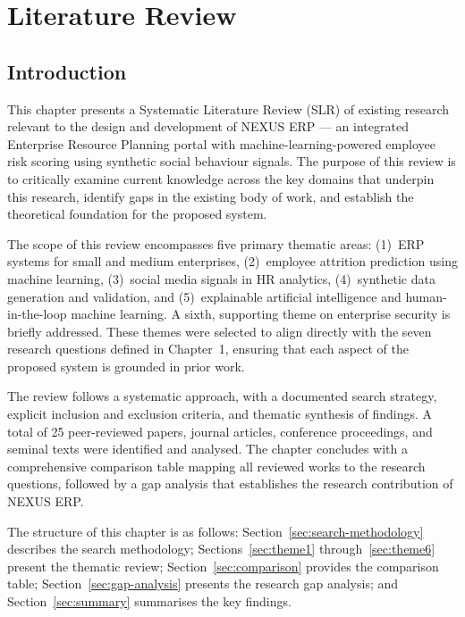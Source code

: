 \documentclass[12pt,a4paper]{article}
\begin{document}
\setcounter{section}{1}  %

\section{Literature Review}
\label{ch:literature-review}

\subsection{Introduction}
\label{sec:introduction}

This chapter presents a Systematic Literature Review (SLR) of existing research relevant to the design and development of NEXUS ERP --- an integrated Enterprise Resource Planning portal with machine-learning-powered employee risk scoring using synthetic social behaviour signals. The purpose of this review is to critically examine current knowledge across the key domains that underpin this research, identify gaps in the existing body of work, and establish the theoretical foundation for the proposed system.

The scope of this review encompasses five primary thematic areas: (1)~ERP systems for small and medium enterprises, (2)~employee attrition prediction using machine learning, (3)~social media signals in HR analytics, (4)~synthetic data generation and validation, and (5)~explainable artificial intelligence and human-in-the-loop machine learning. A sixth, supporting theme on enterprise security is briefly addressed. These themes were selected to align directly with the seven research questions defined in Chapter~1, ensuring that each aspect of the proposed system is grounded in prior work.

The review follows a systematic approach, with a documented search strategy, explicit inclusion and exclusion criteria, and thematic synthesis of findings. A total of 25 peer-reviewed papers, journal articles, conference proceedings, and seminal texts were identified and analysed. The chapter concludes with a comprehensive comparison table mapping all reviewed works to the research questions, followed by a gap analysis that establishes the research contribution of NEXUS ERP.

The structure of this chapter is as follows: Section~\ref{sec:search-methodology} describes the search methodology; Sections~\ref{sec:theme1} through~\ref{sec:theme6} present the thematic review; Section~\ref{sec:comparison} provides the comparison table; Section~\ref{sec:gap-analysis} presents the research gap analysis; and Section~\ref{sec:summary} summarises the key findings.
\end{document}
